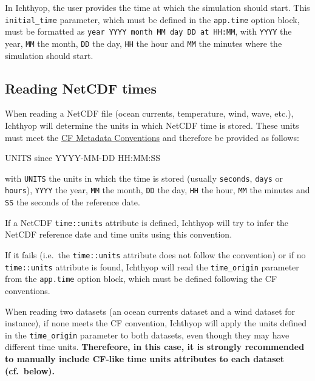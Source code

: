 \documentclass[
  letterpaper,
  DIV=11,
  numbers=noendperiod]{scrreprt}
\newenvironment{Shaded}{\begin{snugshade}}{\end{snugshade}}
\newcommand{\ExtensionTok}[1]{\textcolor[rgb]{0.00,0.23,0.31}{#1}}
\newcommand{\NormalTok}[1]{\textcolor[rgb]{0.00,0.23,0.31}{#1}}
\begin{document}
In Ichthyop, the user provides the time at which the simulation should
start. This \texttt{initial\_time} parameter, which must be defined in
the \texttt{app.time} option block, must be formatted as
\texttt{year\ YYYY\ month\ MM\ day\ DD\ at\ HH:MM}, with \texttt{YYYY}
the year, \texttt{MM} the month, \texttt{DD} the day, \texttt{HH} the
hour and \texttt{MM} the minutes where the simulation should start.

\subsection{Reading NetCDF times}\label{reading-netcdf-times}

When reading a NetCDF file (ocean currents, temperature, wind, wave,
etc.), Ichthyop will determine the units in which NetCDF time is stored.
These units must meet the
\href{https://cfconventions.org/Data/cf-conventions/cf-conventions-1.7/build/ch04s04.html}{CF
Metadata Conventions} and therefore be provided as follows:

\begin{Shaded}
\begin{Highlighting}[]
\ExtensionTok{UNITS}\NormalTok{ since YYYY{-}MM{-}DD HH:MM:SS}
\end{Highlighting}
\end{Shaded}

with \texttt{UNITS} the units in which the time is stored (usually
\texttt{seconds}, \texttt{days} or \texttt{hours}), \texttt{YYYY} the
year, \texttt{MM} the month, \texttt{DD} the day, \texttt{HH} the hour,
\texttt{MM} the minutes and \texttt{SS} the seconds of the reference
date.

If a NetCDF \texttt{time::units} attribute is defined, Ichthyop will try
to infer the NetCDF reference date and time units using this convention.

If it fails (i.e.~the \texttt{time::units} attribute does not follow the
convention) or if no \texttt{time::units} attribute is found, Ichthyop
will read the \texttt{time\_origin} parameter from the \texttt{app.time}
option block, which must be defined following the CF conventions.

When reading two datasets (an ocean currents dataset and a wind dataset
for instance), if none meets the CF convention, Ichthyop will apply the
units defined in the \texttt{time\_origin} parameter to both datasets,
even though they may have different time units. \textbf{Therefeore, in
this case, it is strongly recommended to manually include CF-like time
units attributes to each dataset (cf.~below).}
\end{document}
